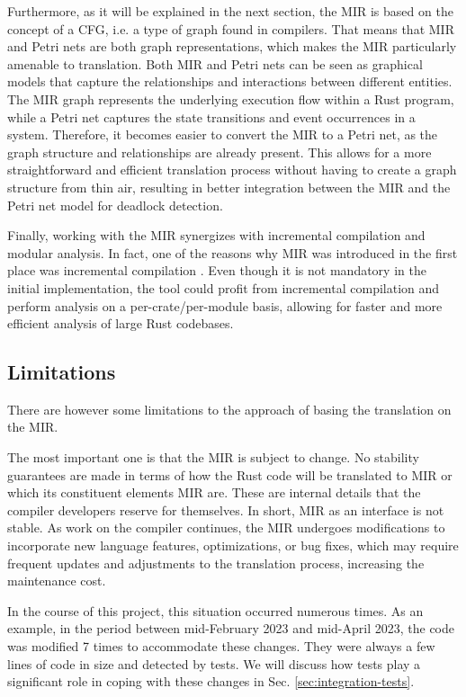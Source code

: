 \documentclass[../../Thesis.tex]{subfiles}
\begin{document}
Furthermore, as it will be explained in the next section, the \acrshort{MIR}
is based on the concept of a \acrfull{CFG}, i.e. a type of graph found in compilers.
That means that \acrshort{MIR} and Petri nets are both graph representations,
which makes the \acrshort{MIR} particularly amenable to translation.
Both \acrshort{MIR} and Petri nets can be seen as graphical models
that capture the relationships and interactions between different entities.
The \acrshort{MIR} graph represents the underlying execution flow within a Rust program,
while a Petri net captures the state transitions and event occurrences in a system.
Therefore, it becomes easier to convert the \acrshort{MIR} to a Petri net,
as the graph structure and relationships are already present.
This allows for a more straightforward and efficient translation process
without having to create a graph structure from thin air,
resulting in better integration between the \acrshort{MIR}
and the Petri net model for deadlock detection.

Finally, working with the \acrshort{MIR} synergizes
with incremental compilation and modular analysis.
In fact, one of the reasons why \acrshort{MIR} was introduced
in the first place was incremental compilation \cite{matsakis2016mir}.
Even though it is not mandatory in the initial implementation,
the tool could profit from incremental compilation
and perform analysis on a per-crate/per-module basis,
allowing for faster and more efficient analysis of large Rust codebases.

\subsection{Limitations}

There are however some limitations to the approach of basing the translation
on the \acrfull{MIR}.

The most important one is that the \acrshort{MIR} is subject to change.
No stability guarantees are made in terms of
how the Rust code will be translated to \acrshort{MIR}
or which its constituent elements \acrshort{MIR} are.
These are internal details that the compiler developers reserve for themselves.
In short, \acrshort{MIR} as an interface is not stable.
As work on the compiler continues,
the \acrshort{MIR} undergoes modifications
to incorporate new language features, optimizations, or bug fixes,
which may require frequent updates and adjustments to the translation process,
increasing the maintenance cost.

In the course of this project, this situation occurred numerous times.
As an example, in the period between mid-February 2023 and mid-April 2023,
the code was modified 7 times to accommodate these changes.
They were always a few lines of code in size and detected by tests.
We will discuss how tests play a significant role
in coping with these changes in Sec. \ref{sec:integration-tests}.
\end{document}
